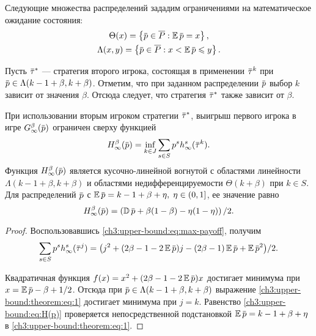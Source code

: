 {Следующие множества распределений зададим ограничениями на математическое ожидание состояния:
\begin{gather*}
  \Theta(x) = \left\{ \p \in \MM: \E \p = x \right\}, \\
  \Lambda(x, y) = \left\{ \p \in \MM: x < \E \p \leqslant y \right\}.
\end{gather*}

Пусть $\tauv^*$ --- стратегия второго игрока, состоящая в применении $\tauv^k$ при $\p \in \Lambda(k-1+\beta,k+\beta)$.
Отметим, что при заданном распределении $\p$ выбор $k$ зависит от значения $\beta$.
Отсюда следует, что стратегия $\tauv^*$ также зависит от $\beta$.

\begin{theorem}
  \label{ch3:upper-bound:theorem}
  При использовании вторым игроком стратегии $\tauv^*$, выигрыш первого игрока в игре
  $\theG[\infty](\p)$ ограничен сверху функцией
  \begin{equation*}
    \High(\p) = \inf_{k \in J} \sum_{s \in S} p^s  h^s_\infty(\tauv^k).
  \end{equation*}
  Функция $\High(\p)$ является кусочно-линейной вогнутой с областями линейности $\Lambda(k - 1 + \beta, k + \beta)$ и областями недифференцируемости $\Theta(k+\beta)$ при $k \in S$.
  Для распределений $\p$ с $\E \p = k - 1 + \beta + \eta, \; \eta \in (0, 1]$, ее значение равно
  \begin{equation}
    \label{ch3:upper-bound:eq:H(p)}
    \High(\p) = \left( \D \p + \beta(1-\beta) - \eta(1-\eta) \right)/2.
  \end{equation}
\end{theorem}
\begin{proof}
  Воспользовавшись \eqref{ch3:upper-bound:eq:max-payoff}, получим
  \begin{equation}
    \label{ch3:upper-bound:theorem:eq:1}
    \begin{gathered}
    \sum_{s \in S} p^s h^s_\infty(\tauv^j) = \bigl(
      j^2 + (2\beta - 1 - 2 \E \p)j - (2\beta - 1) \E \p + \E \p^2 
    \bigr)/2.
    \end{gathered}
  \end{equation}
  
  Квадратичная функция $f(x) = x^2 + (2\beta - 1 - 2\E \p)x$ достигает минимума
  при $x = \E \p - \beta + 1/2$. Отсюда при $\p \in \Lambda(k - 1 + \beta, k +
  \beta)$ выражение \eqref{ch3:upper-bound:theorem:eq:1} достигает минимума при $j =
  k$. Равенство \eqref{ch3:upper-bound:eq:H(p)} проверяется непосредственной
  подстановкой $\E \p = k - 1 + \beta + \eta$ в \eqref{ch3:upper-bound:theorem:eq:1}.
\end{proof}

}
